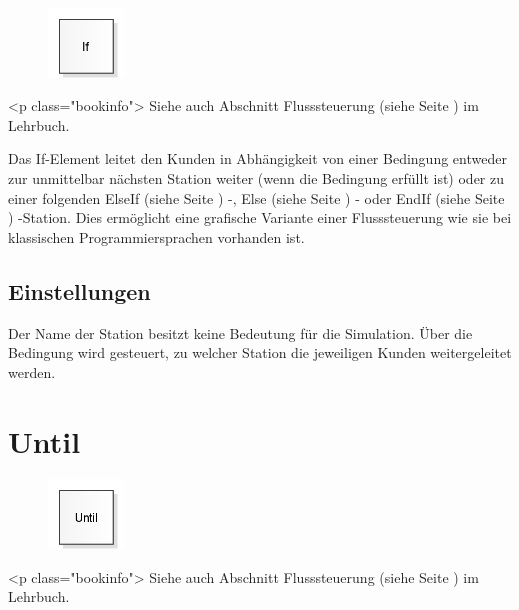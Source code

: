 \begin{figure}
\vspace{-22pt}
\includegraphics[width=2cm]{imageModelElementLogicIf.png}
\vspace{-22pt}
\end{figure}

<p class="bookinfo">
Siehe auch Abschnitt Flusssteuerung (siehe Seite \pageref{ref:book:8.10}) im Lehrbuch.

Das If-Element leitet den Kunden in Abhängigkeit von einer Bedingung entweder
zur unmittelbar nächsten Station weiter (wenn die Bedingung erfüllt ist) oder
zu einer folgenden ElseIf (siehe Seite \pageref{ref:ModelElementLogicElseIf}) -,
Else (siehe Seite \pageref{ref:ModelElementLogicElse}) - oder
EndIf (siehe Seite \pageref{ref:ModelElementLogicEndIf}) -Station.
Dies ermöglicht eine grafische Variante einer Flusssteuerung wie sie bei
klassischen Programmiersprachen vorhanden ist.

\subsection*{Einstellungen}

Der Name der Station besitzt keine Bedeutung für die Simulation. Über die Bedingung
wird gesteuert, zu welcher Station die jeweiligen Kunden weitergeleitet werden.


\section{Until}
\label{ref:ModelElementLogicUntil}

\begin{figure}
\vspace{-22pt}
\includegraphics[width=2cm]{imageModelElementLogicUntil.png}
\vspace{-22pt}
\end{figure}

<p class="bookinfo">
Siehe auch Abschnitt Flusssteuerung (siehe Seite \pageref{ref:book:8.10}) im Lehrbuch.

